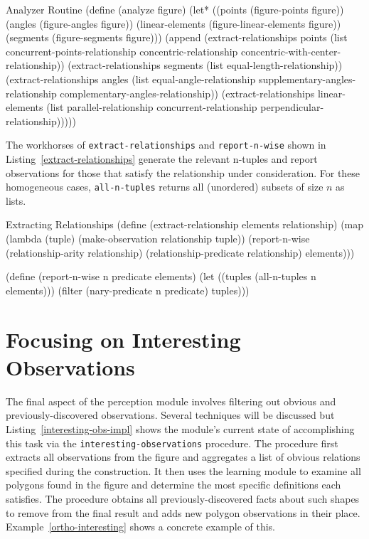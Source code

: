 \begin{code-listing}
[label=analyzer]
{Analyzer Routine}
(define (analyze figure)
  (let* ((points (figure-points figure))
         (angles (figure-angles figure))
         (linear-elements (figure-linear-elements figure))
         (segments (figure-segments figure)))
    (append
     (extract-relationships points
                            (list concurrent-points-relationship
                                  concentric-relationship
                                  concentric-with-center-relationship))
     (extract-relationships segments
                             (list equal-length-relationship))
     (extract-relationships angles
                             (list equal-angle-relationship
                                   supplementary-angles-relationship
                                   complementary-angles-relationship))
     (extract-relationships linear-elements
                             (list parallel-relationship
                                   concurrent-relationship
                                   perpendicular-relationship)))))
\end{code-listing}

The workhorses of \texttt{extract-relationships} and
\texttt{report-n-wise} shown in Listing~\ref{extract-relationships}
generate the relevant n-tuples and report observations for those that
satisfy the relationship under consideration. For these homogeneous
cases, \texttt{all-n-tuples} returns all (unordered) subsets of size
$n$ as lists.

\begin{code-listing}
[label=extract-relationships]
{Extracting Relationships}
(define (extract-relationship elements relationship)
  (map (lambda (tuple)
         (make-observation relationship tuple))
       (report-n-wise
        (relationship-arity relationship)
        (relationship-predicate relationship)
        elements)))

(define (report-n-wise n predicate elements)
  (let ((tuples (all-n-tuples n elements)))
    (filter (nary-predicate n predicate) tuples)))
\end{code-listing}

\section{Focusing on Interesting Observations}

The final aspect of the perception module involves filtering out
obvious and previously-discovered observations.  Several techniques
will be discussed but Listing~\ref{interesting-obs-impl} shows the
module's current state of accomplishing this task via the
\texttt{interesting-observations} procedure. The procedure first
extracts all observations from the figure and aggregates a list of
obvious relations specified during the construction. It then uses the
learning module to examine all polygons found in the figure and
determine the most specific definitions each satisfies. The procedure
obtains all previously-discovered facts about such shapes to remove
from the final result and adds new polygon observations in their
place. Example~\ref{ortho-interesting} shows a concrete example of
this.

